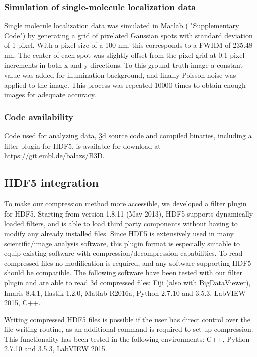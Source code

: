 \subsubsection{Simulation of single-molecule localization data}
Single molecule localization data was simulated in Matlab ( "Supplementary Code") by generating a grid of pixelated Gaussian spots with standard deviation of 1 pixel. With a pixel size of a 100 nm, this corresponds to a FWHM of 235.48 nm. The center of each spot was slightly offset from the pixel grid at 0.1 pixel increments in both x and y directions. To this ground truth image a constant value was added for illumination background, and finally Poisson noise was applied to the image. This process was repeated 10000 times to obtain enough images for adequate accuracy.

\subsubsection{Code availability}
Code used for analyzing data, \b3d source code and compiled binaries, including a filter plugin for HDF5, is available for download at \url{https://git.embl.de/balazs/B3D}.

\subsection{HDF5 integration}
To make our compression method more accessible, we developed a filter plugin for HDF5. Starting from version 1.8.11 (May 2013), HDF5 supports dynamically loaded filters, and is able to load third party components without having to modify any already installed files. Since HDF5 is extensively used in many scientific/image analysis software, this plugin format is especially suitable to equip existing software with compression/decompression capabilities. To read compressed files no modification is required, and any software supporting HDF5 should be compatible. The following software have been tested with our filter plugin and are able to read \b3d compressed files:
Fiji (also with BigDataViewer), Imaris 8.4.1, Ilastik 1.2.0, Matlab R2016a, Python 2.7.10 and 3.5.3, LabVIEW 2015, C++.

Writing compressed HDF5 files is possible if the user has direct control over the file writing routine, as an additional command is required to set up compression. This functionality has been tested in the following environments: C++, Python 2.7.10 and 3.5.3, LabVIEW 2015.




